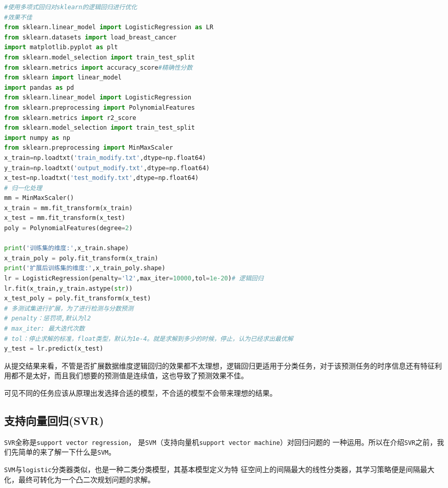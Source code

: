 \documentclass[11pt,a4paper]{elegantpaper}
\begin{document}
\begin{multicols}{2}
\begin{lstlisting}[language=Python]
#使用多项式回归对sklearn的逻辑回归进行优化
#效果不佳
from sklearn.linear_model import LogisticRegression as LR
from sklearn.datasets import load_breast_cancer
import matplotlib.pyplot as plt
from sklearn.model_selection import train_test_split
from sklearn.metrics import accuracy_score#精确性分数
from sklearn import linear_model
import pandas as pd 
from sklearn.linear_model import LogisticRegression
from sklearn.preprocessing import PolynomialFeatures
from sklearn.metrics import r2_score
from sklearn.model_selection import train_test_split
import numpy as np
from sklearn.preprocessing import MinMaxScaler
x_train=np.loadtxt('train_modify.txt',dtype=np.float64)
y_train=np.loadtxt('output_modify.txt',dtype=np.float64)
x_test=np.loadtxt('test_modify.txt',dtype=np.float64)
# 归一化处理   
mm = MinMaxScaler()
x_train = mm.fit_transform(x_train)
x_test = mm.fit_transform(x_test)
poly = PolynomialFeatures(degree=2)

print('训练集的维度:',x_train.shape)
x_train_poly = poly.fit_transform(x_train)
print('扩展后训练集的维度:',x_train_poly.shape)
lr = LogisticRegression(penalty='l2',max_iter=10000,tol=1e-20)# 逻辑回归
lr.fit(x_train,y_train.astype(str))
x_test_poly = poly.fit_transform(x_test) 
# 多测试集进行扩展，为了进行检测与分数预测
# penalty：惩罚项,默认为l2
# max_iter: 最大迭代次数
# tol：停止求解的标准，float类型，默认为1e-4。就是求解到多少的时候，停止，认为已经求出最优解
y_test = lr.predict(x_test)
\end{lstlisting}

从提交结果来看，不管是否扩展数据维度逻辑回归的效果都不太理想，逻辑回归更适用于分类任务，对于该预测任务的时序信息还有特征利用都不是太好，而且我们想要的预测值是连续值，这也导致了预测效果不佳。

可见不同的任务应该从原理出发选择合适的模型，不合适的模型不会带来理想的结果。


\subsection{支持向量回归(SVR)}

\lstinline{SVR}全称是\lstinline{support vector regression}，
是\lstinline{SVM}（支持向量机\lstinline{support vector machine}）对回归问题的
一种运用。所以在介绍\lstinline{SVR}之前，我们先简单的来了解一下什么是\lstinline{SVM}。

\lstinline{SVM}与\lstinline{logistic}分类器类似，也是一种二类分类模型，其基本模型定义为特
征空间上的间隔最大的线性分类器，其学习策略便是间隔最大化，最终可转化为一个凸二次规划问题的求解。


\end{multicols}
\end{document}
